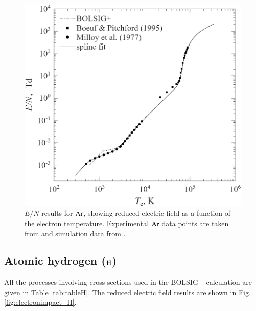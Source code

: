 \begin{figure}[!htbp]
 \center
\includegraphics[width=0.99\linewidth, angle=0.0,scale=0.49]{electronimpact_figs/electronimpact_figureAr.png}
\caption{$E/N$ results for $\rm Ar$, showing reduced electric field as a function of the electron temperature. Experimental $\rm Ar$ data points are taken from  and simulation data from .}
\label{fig:electronimpact_Ar}
\end{figure}


\subsection{Atomic hydrogen ($\rm H$)}

All the processes involving cross-sections used in the BOLSIG+ calculation are given in Table \ref{tab:tableH}. The reduced electric field results are shown in Fig. \ref{fig:electronimpact_H}.

